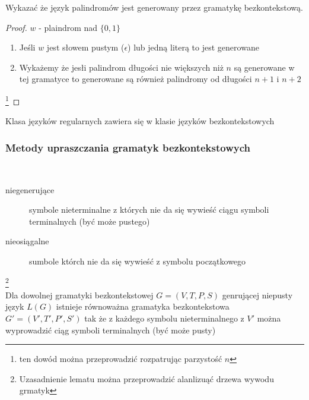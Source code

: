 	
	\begin{przyklad}
		Wykazać że język palindromów jest generowany przez gramatykę bezkontekstową.
	\begin{proof}
		$w$ - plaindrom nad $\{0,1\}$ \\
		\begin{enumerate}
			\item Jeśli $w$ jest słowem pustym ($\epsilon$) lub jedną literą to jest generowane
			\item Wykażemy że jesłi palindrom długości nie większych niż $n$ są generowane w tej gramatyce to
			generowane są również palindromy od długości $n+1$ i $n+2$\\
		\end{enumerate}\footnote{ten dowód można przeprowadzić rozpatrując parzystość $n$}
	\end{proof}
	\end{przyklad}		
	
	\begin{tw}
	Klasa języków regularnych zawiera się w klasie języków bezkontekstowych
	\end{tw}
	
	\subsubsection{Metody upraszczania gramatyk bezkontekstowych}
	
	\begin{df}~\\
		\begin{description}
			\item[niegenerujące] symbole nieterminalne z których nie da się wywieść ciągu symboli terminalnych (być może pustego)
			\item[nieosiągalne] sumbole którch nie da się wywieść z symbolu początkowego
		\end{description}				
	\end{df}	
	
	\begin{lemat}\footnote{Uzasadnienie lematu można przeprowadzić alanlizuąć drzewa wywodu grmatyk}~\\
		Dla dowolnej gramatyki bezkontekstowej $G = (V, T, P, S)$ genrującej niepusty język $L(G)$ istnieje równoważna gramatyka
		bezkontekstowa $G' = (V', T', P', S')$ tak że z każdego symbolu nieterminalnego z $V'$ można wyprowadzić ciąg symboli terminalnych (być może pusty)
	\end{lemat}	
	
